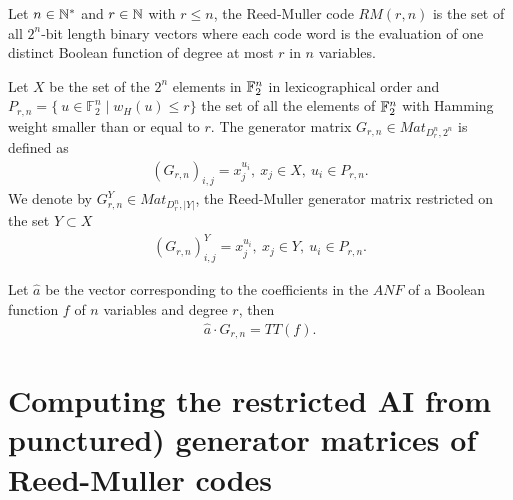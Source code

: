 \documentclass[11pt]{llncs}
\begin{document}
\begin{definition}
	Let $n\in \mathbb{N}^*$ and $r\in \mathbb{N}$ with $r\leq n$, the Reed-Muller code $RM(r,n)$ is the set of all $2^n$-bit length binary vectors where each code word is the evaluation of one distinct Boolean function of degree at most $r$ in $n$ variables.
\end{definition}



\begin{definition}\label{rmGenerator}
	Let $X$ be the set of the $2^n$ elements in $\mathbb{F}_2^n$ in lexicographical order and $P_{r,n} = \{\ u\in \mathbb{F}_2^n \mid w_H(u) \leq r\}$ the set of all the elements of $\mathbb{F}_2^n$ with Hamming weight smaller than or equal to $r$. 
	The generator matrix $G_{r,n}\in Mat_{D_r^n,2^n}$ is defined as
	\begin{align*}
\left(G_{r,n}\right)_{i,j} = x_j^{u_i}, \ x_j \in X,\ u_i \in P_{r,n}.
	\end{align*}
	We denote by $G_{r,n}^Y\in Mat_{D_r^n,|Y|}$, the Reed-Muller generator matrix restricted on the set $Y \subset X$
	\begin{align*}
	\left(G_{r,n}\right)^Y_{i,j} = x_j^{u_i}, \ x_j \in Y,\ u_i \in P_{r,n}.
	\end{align*}
\end{definition}

\begin{remark}
	Let $\hat{a}$ be the vector corresponding to the coefficients in the $ANF$ of a Boolean function $f$ of $n$ variables and degree $r$, then
	\begin{align*}
	\hat{a} \cdot  G_{r,n} = TT(f).
	\end{align*}
\end{remark}




















\section{Computing the restricted AI from punctured) generator matrices of Reed-Muller codes}\label{sec:RMapproach}
\end{document}
